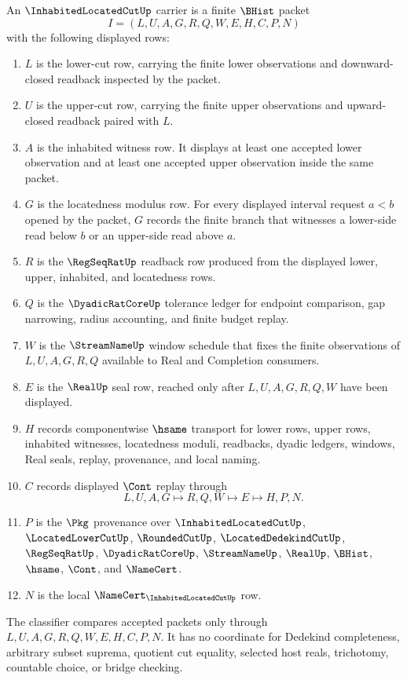 \begin{definition}
\label{def:inhabited-located-cut-carrier}
An $\InhabitedLocatedCutUp$ carrier is a finite $\BHist$ packet
$$
I=(L,U,A,G,R,Q,W,E,H,C,P,N)
$$
with the following displayed rows:
\begin{enumerate}
\item $L$ is the lower-cut row, carrying the finite lower observations and downward-closed readback inspected by the packet.
\item $U$ is the upper-cut row, carrying the finite upper observations and upward-closed readback paired with $L$.
\item $A$ is the inhabited witness row. It displays at least one accepted lower observation and at least one accepted upper observation inside the same packet.
\item $G$ is the locatedness modulus row. For every displayed interval request $a<b$ opened by the packet, $G$ records the finite branch that witnesses a lower-side read below $b$ or an upper-side read above $a$.
\item $R$ is the $\RegSeqRatUp$ readback row produced from the displayed lower, upper, inhabited, and locatedness rows.
\item $Q$ is the $\DyadicRatCoreUp$ tolerance ledger for endpoint comparison, gap narrowing, radius accounting, and finite budget replay.
\item $W$ is the $\StreamNameUp$ window schedule that fixes the finite observations of $L,U,A,G,R,Q$ available to Real and Completion consumers.
\item $E$ is the $\RealUp$ seal row, reached only after $L,U,A,G,R,Q,W$ have been displayed.
\item $H$ records componentwise $\hsame$ transport for lower rows, upper rows, inhabited witnesses, locatedness moduli, readbacks, dyadic ledgers, windows, Real seals, replay, provenance, and local naming.
\item $C$ records displayed $\Cont$ replay through
$$
L,U,A,G \longmapsto R,Q,W \longmapsto E \longmapsto H,P,N .
$$
\item $P$ is the $\Pkg$ provenance over $\InhabitedLocatedCutUp$, $\LocatedLowerCutUp$, $\RoundedCutUp$, $\LocatedDedekindCutUp$, $\RegSeqRatUp$, $\DyadicRatCoreUp$, $\StreamNameUp$, $\RealUp$, $\BHist$, $\hsame$, $\Cont$, and $\NameCert$.
\item $N$ is the local $\NameCert_{\InhabitedLocatedCutUp}$ row.
\end{enumerate}
The classifier compares accepted packets only through $L,U,A,G,R,Q,W,E,H,C,P,N$. It has no coordinate for Dedekind completeness, arbitrary subset suprema, quotient cut equality, selected host reals, trichotomy, countable choice, or bridge checking.
\end{definition}

